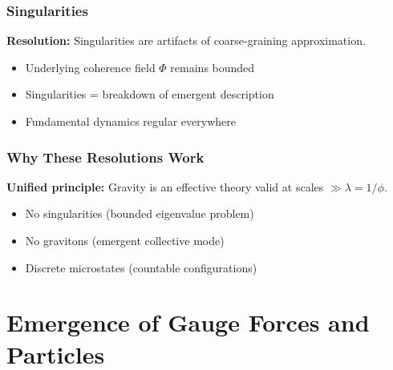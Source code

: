 \documentclass[11pt]{article}
\theoremstyle{definition}
\newcommand{\goldenratio}{\phi}
\begin{document}
\subsubsection{Singularities}

\textbf{Resolution:} Singularities are artifacts of coarse-graining approximation.
\begin{itemize}
\item Underlying coherence field $\Phi$ remains bounded
\item Singularities = breakdown of emergent description
\item Fundamental dynamics regular everywhere
\end{itemize}

\subsubsection{Why These Resolutions Work}

\textbf{Unified principle:} Gravity is an effective theory valid at scales $\gg \lambda = 1/\goldenratio$.
\begin{itemize}
\item No singularities (bounded eigenvalue problem)
\item No gravitons (emergent collective mode)
\item Discrete microstates (countable configurations)
\end{itemize}

\section{Emergence of Gauge Forces and Particles}
\end{document}

